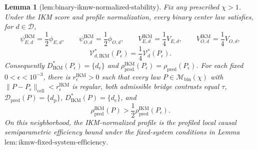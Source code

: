 \documentclass{article}
\newtheorem{lemma}{Lemma}
\begin{document}
\begin{lemma}[lem:binary-ikmw-normalized-stability]\label{lem:binary-ikmw-normalized-stability}
Fix any prescribed \(\chi>1\). Under the IKM score and profile normalization, every binary center law satisfies, for \(d\in\mathcal D\),
\[
 \psi_{E,d}^{\mathrm{IKM}}=\frac12\phi_{E,d},
 \qquad
 \psi_{O,d}^{\mathrm{IKM}}=\frac12\phi_{O,d},
 \qquad
 V_{E,d}^{\mathrm{IKM}}=\frac14V_{E,d},
 \qquad
 V_{O,d}^{\mathrm{IKM}}=\frac14V_{O,d},
\]
\[
 \mathcal V_{d,\mathrm{IKM}}^*(P_\epsilon)
 =\frac14\mathcal V_d^*(P_\epsilon).
\]
Consequently \(D_{\mathrm{IKM}}^*(P_\epsilon)=\{d_{\mathrm e}\}\) and \(\rho_{\mathrm{pred}}^{\mathrm{IKM}}(P_\epsilon)=\rho_{\mathrm{pred}}(P_\epsilon)\). For each fixed \(0<\epsilon<10^{-3}\), there is \(r_\epsilon^{\mathrm{IKM}}>0\) such that every law \(P\in\mathcal M_{\mathrm{bin}}(\chi)\) with \(\|P-P_\epsilon\|_{\mathrm{cell}}<r_\epsilon^{\mathrm{IKM}}\) is regular, both admissible bridge contrasts equal \(\tau\), \(\mathcal D_{\mathrm{pred}}(P)=\{d_{\mathrm p}\}\), \(D_{\mathrm{IKM}}^*(P)=\{d_{\mathrm e}\}\), and
\[
 \rho_{\mathrm{pred}}^{\mathrm{IKM}}(P)
 >\frac12\rho_{\mathrm{pred}}^{\mathrm{IKM}}(P_\epsilon).
\]
On this neighborhood, the IKM-normalized profile is the profiled local causal semiparametric efficiency bound under the fixed-system conditions in Lemma~\(\mathrm{lem{:}ikmw\text{-}fixed\text{-}system\text{-}efficiency}\).
\end{lemma}
\end{document}
